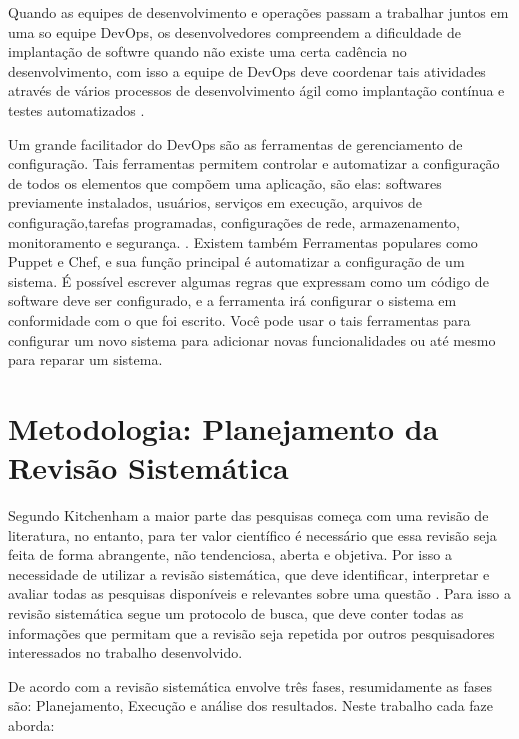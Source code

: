 \documentclass[12pt]{article}
\begin{document}
Quando as equipes de desenvolvimento e operações passam a trabalhar juntos em uma so equipe DevOps, os desenvolvedores compreendem a dificuldade de implantação de softwre quando não existe uma certa cadência no desenvolvimento, com isso a equipe de DevOps deve coordenar tais atividades através de vários processos de desenvolvimento ágil como implantação contínua e testes automatizados \cite{6265084}.

Um grande facilitador do DevOps são as ferramentas de gerenciamento de configuração. Tais ferramentas permitem controlar e automatizar a configuração de todos os elementos que compõem uma aplicação, são elas: softwares previamente instalados, usuários, serviços em execução, arquivos de configuração,tarefas programadas, configurações de rede, armazenamento, monitoramento e segurança. \cite{6265084}. Existem também Ferramentas populares como Puppet e Chef, e sua função principal é automatizar a configuração de um sistema. É possível escrever algumas regras que expressam como um código de software deve ser configurado, e a ferramenta irá configurar o sistema em conformidade com o que foi escrito. Você pode usar o tais  ferramentas para configurar um novo sistema para adicionar novas funcionalidades ou até mesmo para reparar um sistema.

\section{Metodologia: Planejamento da Revisão Sistemática} \label{sec3}

Segundo Kitchenham \cite{kitchenham2004procedures} a maior parte das pesquisas começa com uma revisão de literatura, no entanto, para ter valor científico é necessário que essa revisão seja feita de forma abrangente, não tendenciosa, aberta e objetiva. Por isso a necessidade de utilizar a revisão sistemática, que deve identificar, interpretar e avaliar todas as pesquisas disponíveis e relevantes sobre uma questão \cite{keele2007guidelines}. Para isso a revisão sistemática segue um protocolo de busca, que deve conter todas as informações que permitam que a revisão seja repetida por outros pesquisadores interessados no trabalho desenvolvido.

De acordo com \cite{brereton2007lessons} a revisão sistemática envolve três fases, resumidamente as fases são: Planejamento, Execução e análise dos resultados. Neste trabalho cada faze aborda:
\end{document}
